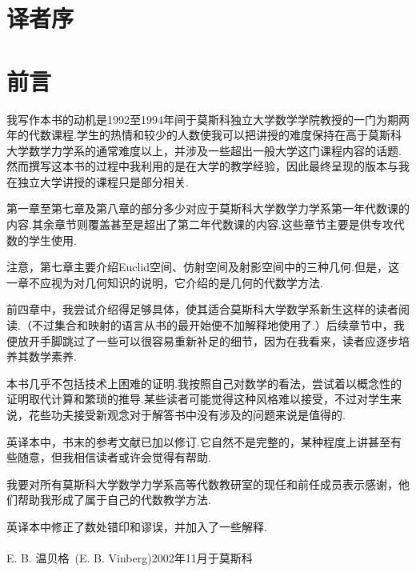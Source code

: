 ﻿\chapter{译\hspace{2ex}者\hspace{2ex}序}

\chapter{前\hspace{4ex}言}
我写作本书的动机是1992至1994年间于莫斯科独立大学数学学院教授的一门为期两年的代数课程.学生的热情和较少的人数使我可以把讲授的难度保持在高于莫斯科大学数学力学系的通常难度以上，并涉及一些超出一般大学这门课程内容的话题.然而撰写这本书的过程中我利用的是在大学的教学经验，因此最终呈现的版本与我在独立大学讲授的课程只是部分相关.

第一章至第七章及第八章的部分多少对应于莫斯科大学数学力学系第一年代数课的内容.其余章节则覆盖甚至是超出了第二年代数课的内容.这些章节主要是供专攻代数的学生使用.

注意，第七章主要介绍Euclid空间、仿射空间及射影空间中的三种几何.但是，这一章不应视为对几何知识的说明，它介绍的是几何的代数学方法.

前四章中，我尝试介绍得足够具体，使其适合莫斯科大学数学系新生这样的读者阅读.（不过集合和映射的语言从书的最开始便不加解释地使用了.）后续章节中，我便放开手脚跳过了一些可以很容易重新补足的细节，因为在我看来，读者应逐步培养其数学素养.

本书几乎不包括技术上困难的证明.我按照自己对数学的看法，尝试着以概念性的证明取代计算和繁琐的推导.某些读者可能觉得这种风格难以接受，不过对学生来说，花些功夫接受新观念对于解答书中没有涉及的问题来说是值得的.

英译本中，书末的参考文献已加以修订.它自然不是完整的，某种程度上讲甚至有些随意，但我相信读者或许会觉得有帮助.

我要对所有莫斯科大学数学力学系高等代数教研室的现任和前任成员表示感谢，他们帮助我形成了属于自己的代数教学方法.

英译本中修正了数处错印和谬误，并加入了一些解释.
~\\~\\
E. B. 温贝格~(E. B. Vinberg)\hfill 2002年11月于莫斯科